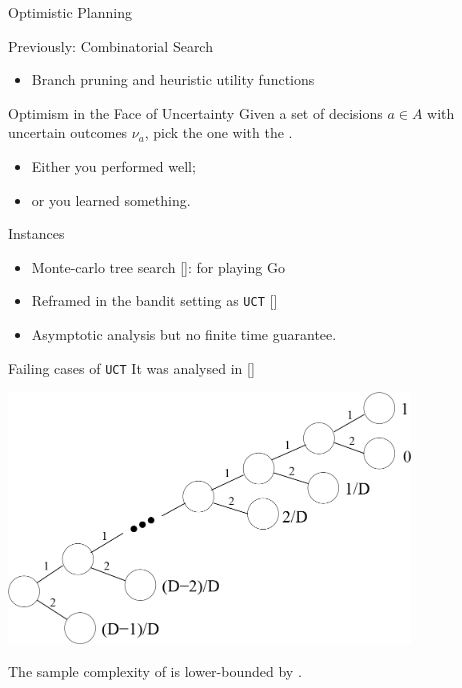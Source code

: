 \documentclass{beamer}
\begin{document}
\begin{frame}{Optimistic Planning}
    
    
    \begin{alertblock}{Previously: Combinatorial Search}
    \begin{itemize}
        \item Branch pruning and heuristic utility functions
    \end{itemize}
    \end{alertblock}
    
    \begin{exampleblock}{Optimism in the Face of Uncertainty}
    Given a set of decisions $a\in A$ with uncertain outcomes $\nu_a$, pick the one with the .
    
    \begin{itemize}
        \item Either you performed well;
        \item or you learned something.
    \end{itemize}
    \end{exampleblock}
    
    
    \begin{block}{Instances}
    \begin{itemize}
        \item Monte-carlo tree search [\cite{Coulom2006}]: for playing Go
        \item Reframed in the bandit setting as \texttt{UCT} [\cite{Kocsis2006}]
        \item Asymptotic analysis but no finite time guarantee.
    \end{itemize}
    \end{block}
\end{frame}


\begin{frame}{Failing cases of \texttt{UCT}}
    It was analysed in [\cite{Coquelin2007}]
    \begin{center}
    \includegraphics[width=0.8\textwidth]{img/uct_fail}
    \end{center}
    The sample complexity of is lower-bounded by .
\end{frame}
\end{document}
